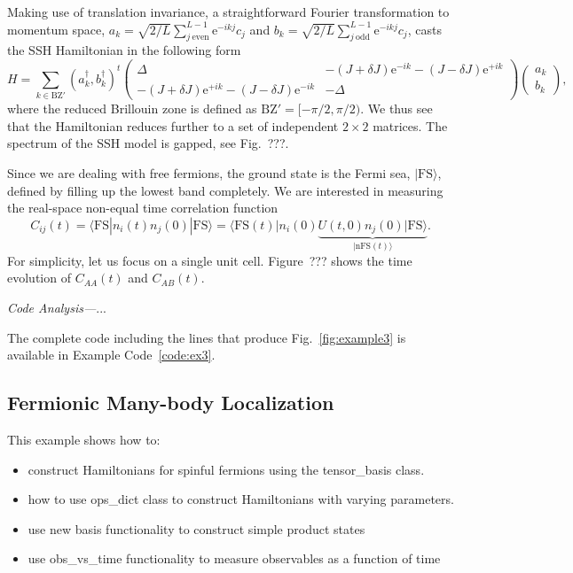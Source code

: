 \documentclass{SciPost}
\newcommand\0{\scalebox{-1}[1]{0}}
\newcommand{\JWcode}{example6.py}
\begin{document}
Making use of translation invariance, a straightforward Fourier transformation to momentum space, $a_k = \sqrt{2/L}\sum_{j\ \mathrm{even}}^{L-1} \mathrm e^{-i k j}c_{j}$ and $b_k = \sqrt{2/L}\sum_{j\ \mathrm{odd}}^{L-1}\mathrm e^{-i k j} c_{j}$, casts the SSH Hamiltonian in the following form
\begin{equation}
H \!=\! \sum_{k\in\mathrm{BZ'}} (a^\dagger_k,b^\dagger_k)^t
\left(\begin{array}{cc}
\Delta & -(J+\delta J)\mathrm e^{-i k} - (J-\delta J)\mathrm e^{+i k} \\
-(J+\delta J)\mathrm e^{+i k} - (J-\delta J)\mathrm e^{-i k} & -\Delta
\end{array}
\right)
\left(\! \begin{array}{c}
a_k\\
b_k
\end{array}
\!\right),
\end{equation}
where the reduced Brillouin zone is defined as $\mathrm{BZ'}=[-\pi/2,\pi/2)$. We thus see that the Hamiltonian reduces further to a set of independent $2\times 2$ matrices. The spectrum of the SSH model is gapped, see Fig.~???.

Since we are dealing with free fermions, the ground state is the Fermi sea, $|\mathrm{FS}\rangle$, defined by filling up the lowest band completely. We are interested in measuring the real-space non-equal time correlation function
\begin{equation}
C_{ij}(t) = \langle \mathrm{FS}|n_i(t)n_j(0)|\mathrm{FS}\rangle = \langle \mathrm{FS}(t)|n_i(0)\underbrace{U(t,0)n_j(0)|\mathrm{FS}\rangle}_{|\mathrm{nFS}(t)\rangle}.
\end{equation}
For simplicity, let us focus on a single unit cell. Figure~??? shows the time evolution of $C_{AA}(t)$ and $C_{AB}(t)$. 

\noindent\emph{Code Analysis---}...


The complete code including the lines that produce Fig.~\ref{fig:example3} is available in Example Code~\ref{code:ex3}.







\subsection{Fermionic Many-body Localization}
\label{subsec:Fermion_MBL}

This example shows how to:
\begin{itemize}
	\item construct Hamiltonians for spinful fermions using the tensor\_basis class.
	\item how to use ops\_dict class to construct Hamiltonians with varying parameters.
	\item use new basis functionality to construct simple product states
	\item use obs\_vs\_time functionality to measure observables as a function of time
\end{itemize}
\end{document}
